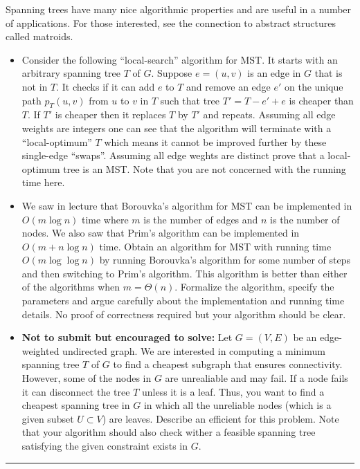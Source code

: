 \documentclass[11pt]{article}
\begin{document}

\item \item Spanning trees have many nice algorithmic properties and are useful
  in a number of applications. For those interested, see the connection
  to abstract structures called matroids.
  \begin{itemize}
  \item Consider the following ``local-search'' algorithm for MST.  It
    starts with an arbitrary spanning tree $T$ of $G$. Suppose
    $e=(u,v)$ is an edge in $G$ that is not in $T$. It checks if it
    can add $e$ to $T$ and remove an edge $e'$ on the unique path
    $p_T(u,v)$ from $u$ to $v$ in $T$ such that tree $T' = T - e' + e$
    is cheaper than $T$.  If $T'$ is cheaper then it replaces $T$ by
    $T'$ and repeats. Assuming all edge weights are integers one can
    see that the algorithm will terminate with a ``local-optimum'' $T$
    which means it cannot be improved further by these single-edge
    ``swaps''.  Assuming all edge weghts are distinct prove that a
    local-optimum tree is an MST. Note that you are not concerned with
    the running time here.
  \item We saw in lecture that Borouvka's algorithm for MST can be
  implemented in $O(m \log n)$ time where $m$ is the number of edges
  and $n$ is the number of nodes. We also saw that Prim's algorithm
  can be implemented in $O(m + n \log n)$ time.
  Obtain an algorithm
    for MST with running time $O(m \log \log n)$ by running Borouvka's
    algorithm for some number of steps and then switching to Prim's
    algorithm. This algorithm is better than either of the algorithms
    when $m = \Theta(n)$. Formalize the algorithm, specify the
    parameters and argue carefully about the implementation and running
    time details. No proof of correctness required but your algorithm should be
    clear.

\item {\bf Not to submit but encouraged to solve:} Let $G=(V,E)$ be an edge-weighted undirected graph.  We are
  interested in computing a minimum spanning tree $T$ of $G$ to find a
  cheapest subgraph that ensures connectivity.  However, some of the
  nodes in $G$ are unrealiable and may fail. If a node fails it can disconnect
  the tree $T$ unless it is a leaf. Thus, you want to find a cheapest
  spanning tree in $G$ in which all the unreliable nodes (which is
  a given subset $U \subset V$) are leaves. Describe an efficient
  for this problem. Note that your algorithm should also check wither
  a feasible spanning tree satisfying the given constraint exists in $G$.
  \end{itemize}
\hrule
\end{document}

